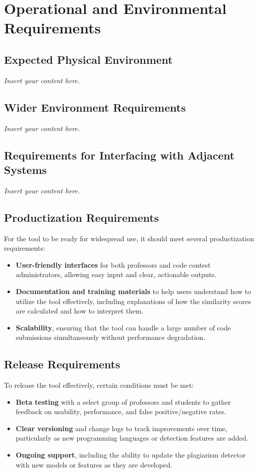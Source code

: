 \documentclass[12pt]{article}
\newcommand{\lips}{\textit{Insert your content here.}}
\begin{document}
\section{Operational and Environmental Requirements}
\subsection{Expected Physical Environment}
\lips
\subsection{Wider Environment Requirements}
\lips
\subsection{Requirements for Interfacing with Adjacent Systems}
\lips
\subsection{Productization Requirements}
For the tool to be ready for widespread use, it should meet several productization requirements:
\begin{itemize}
    \item \textbf{User-friendly interfaces} for both professors and code contest administrators, allowing easy input and clear, actionable outputs.
    \item \textbf{Documentation and training materials} to help users understand how to utilize the tool effectively, including explanations of how the similarity scores are calculated and how to interpret them.
    \item \textbf{Scalability}, ensuring that the tool can handle a large number of code submissions simultaneously without performance degradation.
\end{itemize}

\subsection{Release Requirements}
To release the tool effectively, certain conditions must be met:
\begin{itemize}
    \item \textbf{Beta testing} with a select group of professors and students to gather feedback on usability, performance, and false positive/negative rates.
    \item \textbf{Clear versioning} and change logs to track improvements over time, particularly as new programming languages or detection features are added.
    \item \textbf{Ongoing support}, including the ability to update the plagiarism detector with new models or features as they are developed.
\end{itemize}
\end{document}
